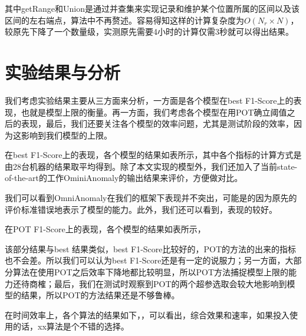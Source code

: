   其中getRange和Union是通过并查集来实现记录和维护某个位置所属的区间以及该区间的左右端点，算法中不再赘述。容易得知这样的计算复杂度为$O(N_r\times N)$，较原先下降了一个数量级，实测原先需要4小时的计算仅需3秒就可以得出结果。
\section{实验结果与分析}
我们考虑实验结果主要从三方面来分析，一方面是各个模型在best F1-Score上的表现，也就是模型上限的衡量。再一方面，我们考虑各个模型在用POT确立阈值之后的表现，最后，我们还要关注各个模型的效率问题，尤其是测试阶段的效率，因为这影响到我们模型的上限。

在best F1-Score上的表现，各个模型的结果如表所示，其中各个指标的计算方式是由28台机器的结果取平均得到。除了本文实现的模型外，我们还加入了当前state-of-the-art的工作OminiAnomaly\cite{su2019robust}的输出结果来评价，方便做对比。

我们可以看到OmniAnomaly在我们的框架下表现并不突出，可能是的因为原先的评价标准错误地表示了模型的能力。此外，我们还可以看到，表现的较好。

在POT F1-Score上的表现，各个模型的结果如表所示，

该部分结果与best 结果类似，best F1-Score比较好的，POT的方法的出来的指标也不会差。所以我们可以认为best F1-Score还是有一定的说服力；另一方面，大部分算法在使用POT之后效率下降地都比较明显，所以POT方法捕捉模型上限的能力还待商榷；最后，我们在测试时观察到POT的两个超参选取会较大地影响到模型的结果，所以POT的方法结果还是不够鲁棒。

在时间效率上，各个算法的结果如下，，可以看出，综合效果和速率，如果投入使用的话，xx算法是个不错的选择。



